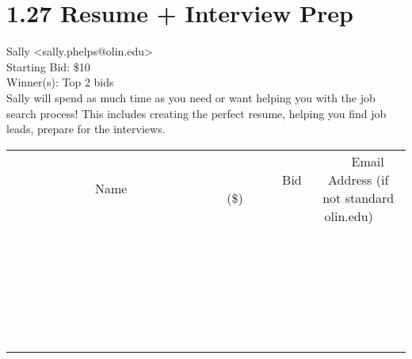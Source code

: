 \documentclass[11pt]{article}
\begin{document}
					\section*{1.27 Resume + Interview Prep}
					Sally <sally.phelps@olin.edu> \\
					Starting Bid: \$10 \\
					Winner(s): Top 2 bids \\
					Sally will spend as much time as you need or want helping you with the job search process!  This includes creating the perfect resume, helping you find job leads, prepare for the interviews. \\
					[6ex]
					\begin{tabular}{c c c}
						~~~~~~~~~~~~~Name~~~~~~~~~~~~~ & ~~~~~~~~~Bid (\$)~~~~~~~~~ & ~~~Email Address (if not standard olin.edu)~~~ \\
				
 & & \\
\hline
 & & \\
\hline
 & & \\
\hline
 & & \\
\hline
 & & \\
\hline
 & & \\
\hline
 & & \\
\hline
 & & \\
\hline
 & & \\
\hline
 & & \\
\hline
 & & \\
\hline
 & & \\
\hline
 & & \\
\hline
 & & \\
\hline
 & & \\
\hline
 & & \\
\hline
 & & \\
\hline
 & & \\
\hline
 & & \\
\hline
 & & \\
\hline
 & & \\
\hline
 & & \\
\hline
 & & \\
\hline
 & & \\
\hline
 & & \\
\hline
 & & \\
\hline
					\end{tabular}
					\clearpage
				
\end{document}
